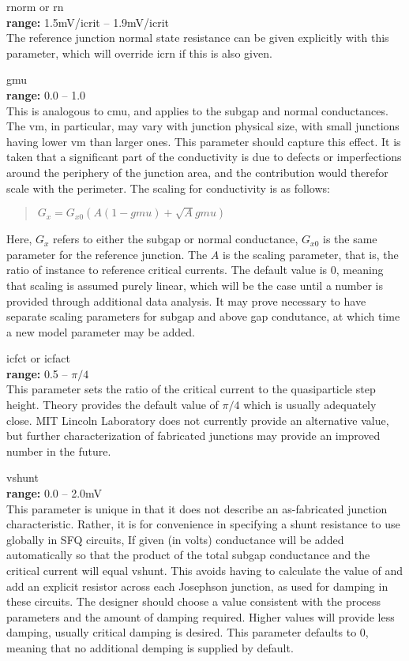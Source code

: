 \begin{description}
\item{{\vt rnorm} or {\vt rn}}\\
{\bf range:} 1.5mV/{\vt icrit} -- 1.9mV/{\vt icrit}\\
The reference junction normal state resistance can be given explicitly
with this parameter, which will override {\vt icrn} if this is also
given.

\item{\vt gmu}\\
{\bf range:} 0.0 -- 1.0\\
This is analogous to {\vt cmu}, and applies to the subgap and normal
conductances.  The {\vt vm}, in particular, may vary with junction
physical size, with small junctions having lower {\vt vm} than larger
ones.  This parameter should capture this effect.  It is taken that a
significant part of the conductivity is due to defects or
imperfections around the periphery of the junction area, and the
contribution would therefor scale with the perimeter.  The scaling for
conductivity is as follows:
\begin{quote}
$G_x = G_{x0} (A(1-gmu) + \sqrt{A} gmu)$
\end{quote}
Here, $G_x$ refers to either the subgap or normal conductance,
$G_{x0}$ is the same parameter for the reference junction.  The $A$ is
the scaling parameter, that is, the ratio of instance to reference
critical currents.  The default value is 0, meaning that scaling is
assumed purely linear, which will be the case until a number is
provided through additional data analysis.  It may prove necessary to
have separate scaling parameters for subgap and above gap condutance,
at which time a new model parameter may be added.

\item{{\vt icfct} or {\vt icfact}}\\
{\bf range:} 0.5 -- ${\pi}/4$\\
This parameter sets the ratio of the critical current to the
quasiparticle step height.  Theory provides the default value of
$\pi/4$ which is usually adequately close.  MIT Lincoln Laboratory
does not currently provide an alternative value, but further
characterization of fabricated junctions may provide an improved
number in the future.

\item{\vt vshunt}\\
{\bf range:} 0.0 -- 2.0mV\\
This parameter is unique in that it does not describe an as-fabricated
junction characteristic.  Rather, it is for convenience in specifying
a shunt resistance to use globally in SFQ circuits, If given (in
volts) conductance will be added automatically so that the product of
the total subgap conductance and the critical current will equal {\vt
vshunt}.  This avoids having to calculate the value of and add an
explicit resistor across each Josephson junction, as used for damping
in these circuits.  The designer should choose a value consistent with
the process parameters and the amount of damping required.  Higher
values will provide less damping, usually critical damping is desired. 
This parameter defaults to 0, meaning that no additional demping is
supplied by default.


\end{description}
